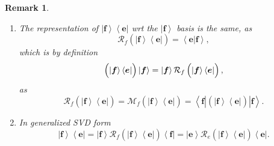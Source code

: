 \documentclass[aps,preprint]{revtex4}
\newtheorem{remark}[theorem]{Remark}
\begin{document}
\begin{remark}
\begin{enumerate}
\item The representation of $\left\vert \boldsymbol{f}\right\rangle
\left\langle \boldsymbol{e}\right\vert $ wrt the $\left\vert \boldsymbol{f}%
\right\rangle $ basis i\emph{s the same, as} 
\begin{equation}
\mathcal{R}_{f}\left( \overset{}{\left\vert \boldsymbol{f}\right\rangle
\left\langle \boldsymbol{e}\right\vert }\right) =\left\langle \left. 
\boldsymbol{e}\right\vert \boldsymbol{f}\right\rangle ,
\end{equation}%
which is by definition 
\begin{equation}
\left( \overset{}{\left\vert \boldsymbol{f}\right\rangle \left\langle 
\boldsymbol{e}\right\vert }\right) \left\vert \boldsymbol{f}\right\rangle
=\left\vert \boldsymbol{f}\right\rangle \mathcal{R}_{f}\left( \overset{}{%
\left\vert \boldsymbol{f}\right\rangle \left\langle \boldsymbol{e}%
\right\vert }\right) ,
\end{equation}%
as 
\begin{equation}
\mathcal{R}_{f}\left( \overset{}{\left\vert \boldsymbol{f}\right\rangle
\left\langle \boldsymbol{e}\right\vert }\right) =\mathcal{M}_{f}\left( 
\overset{}{\left\vert \boldsymbol{f}\right\rangle \left\langle \boldsymbol{e}%
\right\vert }\right) =\left\langle \overset{}{\boldsymbol{f}}\right\vert
\left( \overset{}{\left\vert \boldsymbol{f}\right\rangle \left\langle 
\boldsymbol{e}\right\vert }\right) \left\vert \overset{}{\boldsymbol{f}}%
\right\rangle .
\end{equation}

\item In generalized SVD form 
\begin{equation}
\left\vert \boldsymbol{f}\right\rangle \left\langle \boldsymbol{e}%
\right\vert =\left\vert \boldsymbol{f}\right\rangle \mathcal{R}_{f}\left( 
\overset{}{\left\vert \boldsymbol{f}\right\rangle \left\langle \boldsymbol{e}%
\right\vert }\right) \left\langle \boldsymbol{f}\right\vert =\left\vert 
\boldsymbol{e}\right\rangle \mathcal{R}_{e}\left( \overset{}{\left\vert 
\boldsymbol{f}\right\rangle \left\langle \boldsymbol{e}\right\vert }\right)
\left\langle \boldsymbol{e}\right\vert .
\end{equation}


\end{enumerate}
\end{remark}
\end{document}
